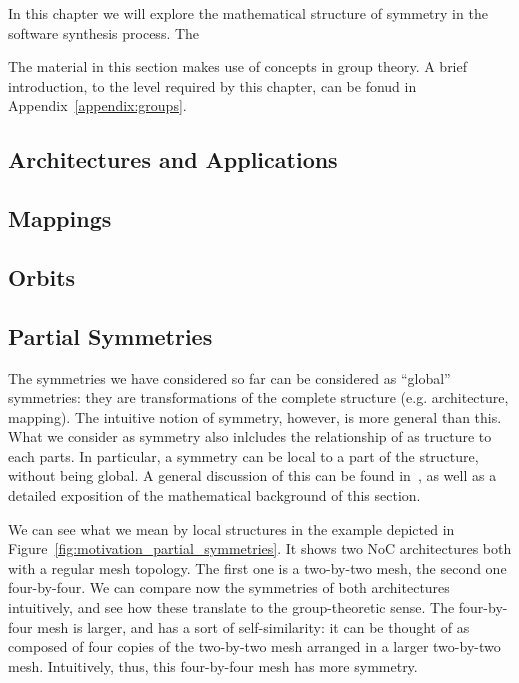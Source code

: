 In this chapter we will explore the mathematical structure of symmetry in the software synthesis process. The
\blindtext[2]

The material in this section makes use of concepts in group theory. A brief introduction, to the level required by this chapter, can be fonud in Appendix~\ref{appendix:groups}.


\subsection{Architectures and Applications}
\Blindtext[5]

\subsection{Mappings}
\Blindtext[5]

\subsection{Orbits}
\Blindtext[5]

\subsection{Partial Symmetries}

The symmetries we have considered so far can be considered as ``global'' symmetries: they are transformations of the complete structure (e.g. architecture, mapping).
The intuitive notion of symmetry, however, is more general than this. What we consider as symmetry also inlcludes the relationship of as tructure to each parts.
In particular, a symmetry can be local to a part of the structure, without being global. A general discussion of this can be found in~\cite{lawson_inverse_semigroups}, as well as a detailed exposition of the mathematical background of this section.

We can see what we mean by local structures in the example depicted in Figure~\ref{fig:motivation_partial_symmetries}.
It shows two \ac{NoC} architectures both with a regular mesh topology.
The first one is a two-by-two mesh, the second one four-by-four.
We can compare now the symmetries of both architectures intuitively, and see how these translate to the group-theoretic sense.
The four-by-four mesh is larger, and has a sort of self-similarity: it can be thought of as composed of four copies of the two-by-two mesh arranged in a larger two-by-two mesh.
Intuitively, thus, this four-by-four mesh has more symmetry.

